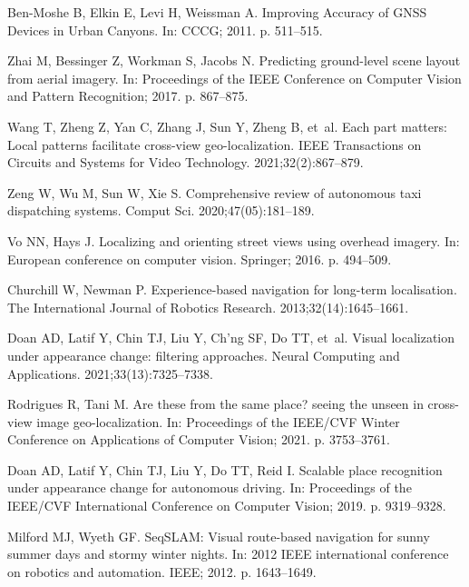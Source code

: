 \documentclass[10pt,letterpaper]{article}
\begin{document}
\begin{thebibliography}{10}

  Ben-Moshe B, Elkin E, Levi H, Weissman A.
  \newblock Improving Accuracy of GNSS Devices in Urban Canyons.
  \newblock In: CCCG; 2011. p. 511--515.
  
  Zhai M, Bessinger Z, Workman S, Jacobs N.
  \newblock Predicting ground-level scene layout from aerial imagery.
  \newblock In: Proceedings of the IEEE Conference on Computer Vision and Pattern
    Recognition; 2017. p. 867--875.
  
  Wang T, Zheng Z, Yan C, Zhang J, Sun Y, Zheng B, et~al.
  \newblock Each part matters: Local patterns facilitate cross-view
    geo-localization.
  \newblock IEEE Transactions on Circuits and Systems for Video Technology.
    2021;32(2):867--879.
  
  Zeng W, Wu M, Sun W, Xie S.
  \newblock Comprehensive review of autonomous taxi dispatching systems.
  \newblock Comput Sci. 2020;47(05):181--189.
  
  Vo NN, Hays J.
  \newblock Localizing and orienting street views using overhead imagery.
  \newblock In: European conference on computer vision. Springer; 2016. p.
    494--509.
  
  Churchill W, Newman P.
  \newblock Experience-based navigation for long-term localisation.
  \newblock The International Journal of Robotics Research.
    2013;32(14):1645--1661.
  
  Doan AD, Latif Y, Chin TJ, Liu Y, Ch’ng SF, Do TT, et~al.
  \newblock Visual localization under appearance change: filtering approaches.
  \newblock Neural Computing and Applications. 2021;33(13):7325--7338.
  
  Rodrigues R, Tani M.
  \newblock Are these from the same place? seeing the unseen in cross-view image
    geo-localization.
  \newblock In: Proceedings of the IEEE/CVF Winter Conference on Applications of
    Computer Vision; 2021. p. 3753--3761.
  
  Doan AD, Latif Y, Chin TJ, Liu Y, Do TT, Reid I.
  \newblock Scalable place recognition under appearance change for autonomous
    driving.
  \newblock In: Proceedings of the IEEE/CVF International Conference on Computer
    Vision; 2019. p. 9319--9328.
  
  Milford MJ, Wyeth GF.
  \newblock SeqSLAM: Visual route-based navigation for sunny summer days and
    stormy winter nights.
  \newblock In: 2012 IEEE international conference on robotics and automation.
    IEEE; 2012. p. 1643--1649.
  

\end{thebibliography}
\end{document}
